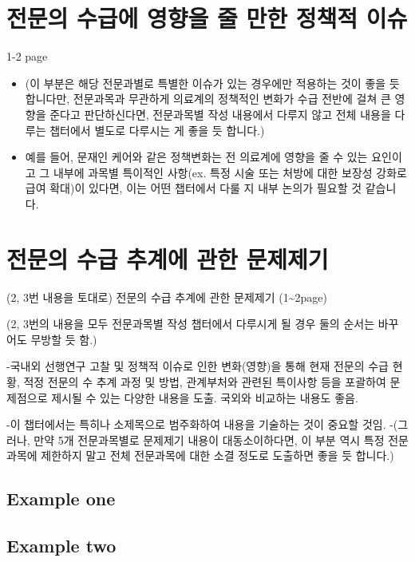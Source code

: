 \documentclass[]{book}
\begin{document}
\hypertarget{section-9}{%
\chapter{전문의 수급에 영향을 줄 만한 정책적 이슈}\label{section-9}}

1-2 page

\begin{itemize}
\item
  (이 부분은 해당 전문과별로 특별한 이슈가 있는 경우에만 적용하는 것이 좋을 듯 합니다만, 전문과목과 무관하게 의료계의 정책적인 변화가 수급 전반에 걸쳐 큰 영향을 준다고 판단하신다면, 전문과목별 작성 내용에서 다루지 않고 전체 내용을 다루는 챕터에서 별도로 다루시는 게 좋을 듯 합니다.)
\item
  예를 들어, 문재인 케어와 같은 정책변화는 전 의료계에 영향을 줄 수 있는 요인이고 그 내부에 과목별 특이적인 사항(ex. 특정 시술 또는 처방에 대한 보장성 강화로 급여 확대)이 있다면, 이는 어떤 챕터에서 다룰 지 내부 논의가 필요할 것 같습니다.
\end{itemize}

\hypertarget{section-10}{%
\chapter{전문의 수급 추계에 관한 문제제기}\label{section-10}}

(2, 3번 내용을 토대로) 전문의 수급 추계에 관한 문제제기 (1\textasciitilde2page)

(2, 3번의 내용을 모두 전문과목별 작성 챕터에서 다루시게 될 경우 둘의 순서는 바꾸어도 무방할 듯 함.)

-국내외 선행연구 고찰 및 정책적 이슈로 인한 변화(영향)을 통해 현재 전문의 수급 현황, 적정 전문의 수 추계 과정 및 방법, 관계부처와 관련된 특이사항 등을 포괄하여 문제점으로 제시될 수 있는 다양한 내용을 도출. 국외와 비교하는 내용도 좋음.

-이 챕터에서는 특히나 소제목으로 범주화하여 내용을 기술하는 것이 중요할 것임.
-(그러나, 만약 5개 전문과목별로 문제제기 내용이 대동소이하다면, 이 부분 역시 특정 전문과목에 제한하지 말고 전체 전문과목에 대한 소결 정도로 도출하면 좋을 듯 합니다.)

\hypertarget{example-one}{%
\section{Example one}\label{example-one}}

\hypertarget{example-two}{%
\section{Example two}\label{example-two}}
\end{document}
